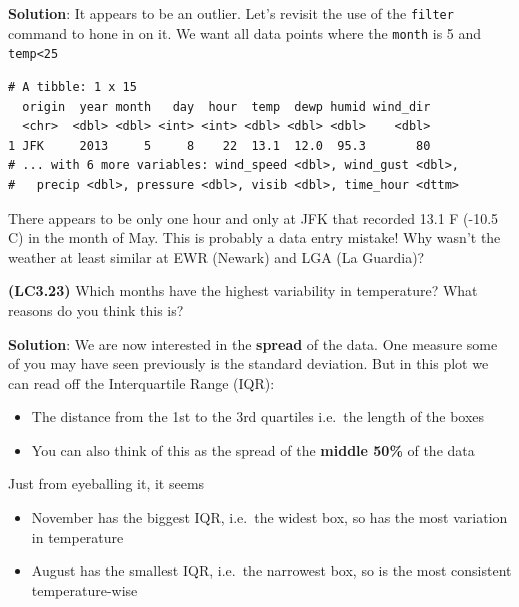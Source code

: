 \documentclass[12pt,]{krantz}
\makeatletter
\newenvironment{Shaded}{\begin{snugshade}}{\end{snugshade}}
\newcommand{\KeywordTok}[1]{\textcolor[rgb]{0.27,0.27,0.27}{\textbf{#1}}}
\newcommand{\DecValTok}[1]{\textcolor[rgb]{0.06,0.06,0.06}{#1}}
\newcommand{\StringTok}[1]{\textcolor[rgb]{0.5,0.5,0.5}{#1}}
\newcommand{\OperatorTok}[1]{\textcolor[rgb]{0.43,0.43,0.43}{\textbf{#1}}}
\newcommand{\NormalTok}[1]{#1}
\providecommand{\tightlist}{%
  \setlength{\itemsep}{0pt}\setlength{\parskip}{0pt}}
\newenvironment{kframe}{%
\medskip{}
\setlength{\fboxsep}{.8em}
 \def\at@end@of@kframe{}%
 \ifinner\ifhmode%
  \def\at@end@of@kframe{\end{minipage}}%
  \begin{minipage}{\columnwidth}%
 \fi\fi%
 \def\FrameCommand##1{\hskip\@totalleftmargin \hskip-\fboxsep
 \colorbox{shadecolor}{##1}\hskip-\fboxsep
     \hskip-\linewidth \hskip-\@totalleftmargin \hskip\columnwidth}%
 \MakeFramed {\advance\hsize-\width
   \@totalleftmargin\z@ \linewidth\hsize
   \@setminipage}}%
 {\par\unskip\endMakeFramed%
 \at@end@of@kframe}
\renewenvironment{Shaded}{\begin{kframe}}{\end{kframe}}
\makeatother
\begin{document}
\textbf{Solution}: It appears to be an outlier. Let's revisit the use of
the \texttt{filter} command to hone in on it. We want all data points
where the \texttt{month} is 5 and \texttt{temp\textless{}25}

\begin{Shaded}
\end{Shaded}

\begin{verbatim}
# A tibble: 1 x 15
  origin  year month   day  hour  temp  dewp humid wind_dir
  <chr>  <dbl> <dbl> <int> <int> <dbl> <dbl> <dbl>    <dbl>
1 JFK     2013     5     8    22  13.1  12.0  95.3       80
# ... with 6 more variables: wind_speed <dbl>, wind_gust <dbl>,
#   precip <dbl>, pressure <dbl>, visib <dbl>, time_hour <dttm>
\end{verbatim}

There appears to be only one hour and only at JFK that recorded 13.1 F
(-10.5 C) in the month of May. This is probably a data entry mistake!
Why wasn't the weather at least similar at EWR (Newark) and LGA (La
Guardia)?

\textbf{(LC3.23)} Which months have the highest variability in
temperature? What reasons do you think this is?

\textbf{Solution}: We are now interested in the \textbf{spread} of the
data. One measure some of you may have seen previously is the standard
deviation. But in this plot we can read off the Interquartile Range
(IQR):

\begin{itemize}
\tightlist
\item
  The distance from the 1st to the 3rd quartiles i.e.~the length of the
  boxes
\item
  You can also think of this as the spread of the \textbf{middle 50\%}
  of the data
\end{itemize}

Just from eyeballing it, it seems

\begin{itemize}
\tightlist
\item
  November has the biggest IQR, i.e.~the widest box, so has the most
  variation in temperature
\item
  August has the smallest IQR, i.e.~the narrowest box, so is the most
  consistent temperature-wise
\end{itemize}
\end{document}
